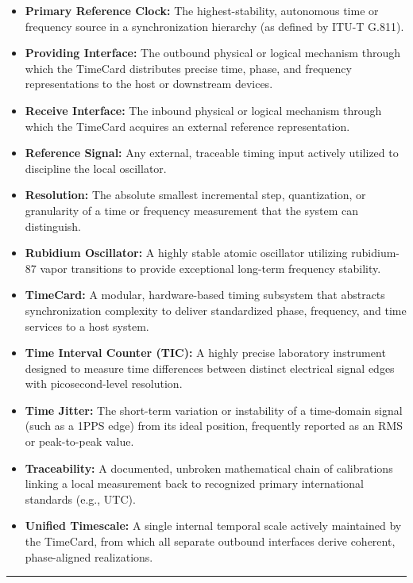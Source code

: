 \begin{itemize}
  variance of a measurement under identical operating conditions.
\item
  \textbf{Primary Reference Clock:} The highest-stability, autonomous
  time or frequency source in a synchronization hierarchy (as defined by
  ITU-T G.811).
\item
  \textbf{Providing Interface:} The outbound physical or logical
  mechanism through which the TimeCard distributes precise time, phase,
  and frequency representations to the host or downstream devices.
\item
  \textbf{Receive Interface:} The inbound physical or logical mechanism
  through which the TimeCard acquires an external reference
  representation.
\item
  \textbf{Reference Signal:} Any external, traceable timing input
  actively utilized to discipline the local oscillator.
\item
  \textbf{Resolution:} The absolute smallest incremental step,
  quantization, or granularity of a time or frequency measurement that
  the system can distinguish.
\item
  \textbf{Rubidium Oscillator:} A highly stable atomic oscillator
  utilizing rubidium-87 vapor transitions to provide exceptional
  long-term frequency stability.
\item
  \textbf{TimeCard:} A modular, hardware-based timing subsystem that
  abstracts synchronization complexity to deliver standardized phase,
  frequency, and time services to a host system.
\item
  \textbf{Time Interval Counter (TIC):} A highly precise laboratory
  instrument designed to measure time differences between distinct
  electrical signal edges with picosecond-level resolution.
\item
  \textbf{Time Jitter:} The short-term variation or instability of a
  time-domain signal (such as a 1PPS edge) from its ideal position,
  frequently reported as an RMS or peak-to-peak value.
\item
  \textbf{Traceability:} A documented, unbroken mathematical chain of
  calibrations linking a local measurement back to recognized primary
  international standards (e.g., UTC).
\item
  \textbf{Unified Timescale:} A single internal temporal scale actively
  maintained by the TimeCard, from which all separate outbound
  interfaces derive coherent, phase-aligned realizations.
\end{itemize}

\begin{center}\rule{0.5\linewidth}{0.5pt}\end{center}


